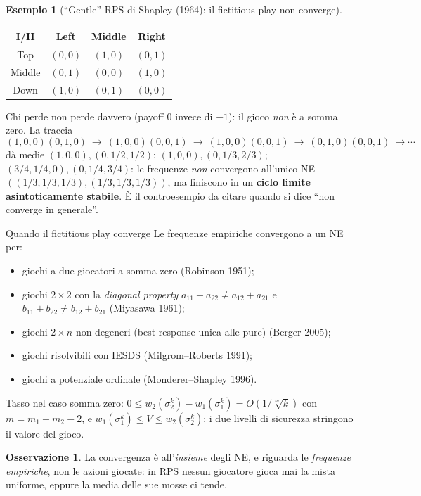 \documentclass[12pt,a4paper,twoside]{book}
\theoremstyle{plain}
\theoremstyle{definition}
\newtheorem{example}[theorem]{Esempio}
\newtheorem{remark}[theorem]{Osservazione}
\begin{document}
\begin{example}[``Gentle'' RPS di Shapley (1964): il fictitious play non converge]
\begin{center}
\begin{tabular}{c|ccc}
I/II & Left & Middle & Right\\\hline
Top & $(0,0)$ & $(1,0)$ & $(0,1)$\\
Middle & $(0,1)$ & $(0,0)$ & $(1,0)$\\
Down & $(1,0)$ & $(0,1)$ & $(0,0)$
\end{tabular}
\end{center}
Chi perde non perde davvero (payoff $0$ invece di $-1$): il gioco \emph{non} è a
somma zero. La traccia
\[
  (1,0,0)(0,1,0)\ \to\ (1,0,0)(0,0,1)\ \to\ (1,0,0)(0,0,1)\ \to\ (0,1,0)(0,0,1)\ \to\cdots
\]
dà medie $(1,0,0),(0,1/2,1/2)$; $(1,0,0),(0,1/3,2/3)$; $(3/4,1/4,0),(0,1/4,3/4)$: le
frequenze \emph{non} convergono all'unico NE $((1/3,1/3,1/3),(1/3,1/3,1/3))$, ma
finiscono in un \textbf{ciclo limite asintoticamente stabile}. È il controesempio
da citare quando si dice ``non converge in generale''.
\end{example}

\begin{thmbox}{Quando il fictitious play converge}
Le frequenze empiriche convergono a un NE per:
\begin{itemize}
  \item giochi a due giocatori a somma zero \hfill (Robinson 1951);
  \item giochi $2\times 2$ con la \emph{diagonal property}
        $a_{11}+a_{22}\ne a_{12}+a_{21}$ e $b_{11}+b_{22}\ne b_{12}+b_{21}$
        \hfill (Miyasawa 1961);
  \item giochi $2\times n$ non degeneri (best response unica alle pure)
        \hfill (Berger 2005);
  \item giochi risolvibili con IESDS \hfill (Milgrom--Roberts 1991);
  \item giochi a potenziale ordinale \hfill (Monderer--Shapley 1996).
\end{itemize}
Tasso nel caso somma zero: $0\le w_2(\sigma^k_2)-w_1(\sigma^k_1)=O(1/\sqrt[m]{k})$
con $m=m_1+m_2-2$, e $w_1(\sigma^k_1)\le V\le w_2(\sigma^k_2)$: i due livelli di
sicurezza stringono il valore del gioco.
\end{thmbox}

\begin{remark}
La convergenza è all'\emph{insieme} degli NE, e riguarda le \emph{frequenze
empiriche}, non le azioni giocate: in RPS nessun giocatore gioca mai la mista
uniforme, eppure la media delle sue mosse ci tende.
\end{remark}
\end{document}
